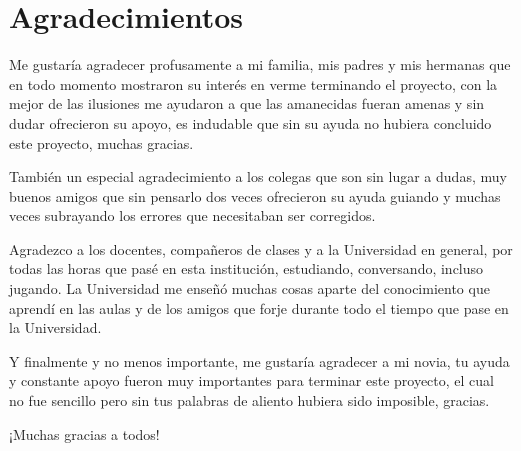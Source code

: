 \chapter*{Agradecimientos} %


%

Me gustaría agradecer profusamente a mi familia, mis padres y mis hermanas que en todo momento mostraron su interés en verme terminando el proyecto, con la mejor de las ilusiones me ayudaron a que las amanecidas fueran amenas y sin dudar ofrecieron su apoyo, es indudable que sin su ayuda no hubiera concluido este proyecto, muchas gracias.

También un especial agradecimiento a los colegas que son sin lugar a dudas, muy buenos amigos que sin pensarlo dos veces ofrecieron su ayuda guiando y muchas veces subrayando los errores que necesitaban ser corregidos.

Agradezco a los docentes, compañeros de clases y a la Universidad en general, por todas las horas que pasé en esta institución, estudiando, conversando, incluso jugando. La Universidad me enseñó muchas cosas aparte del conocimiento que aprendí en las aulas y de los amigos que forje durante todo el tiempo que pase en la Universidad.

Y finalmente y no menos importante, me gustaría agradecer a mi novia, tu ayuda y constante apoyo fueron muy importantes para terminar este proyecto, el cual no fue sencillo pero sin tus palabras de aliento hubiera sido imposible, gracias.


¡Muchas gracias a todos!
